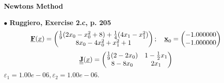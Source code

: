 \documentclass{report}[10pts]
\begin{document}
   \begin{center}
   \textbf{\Large{Newtons Method}}
   \end{center}
$\bullet$
\textbf{Ruggiero, Exercise 2.c, p. 205}
\[
   \Vector{F}(\underline{x})=
      \begin{pmatrix*}
      \frac{1}{9}(2x_0-x_0^2+8)+\frac{1}{4}(4x_1-x_1^2) \\ 8x_0-4x_0^2+x_1^2+1
      \end{pmatrix*}
   ;\quad
   \Vector{x}_0=
      \begin{pmatrix*}[r]
      -1.000000 \\ -1.000000
      \end{pmatrix*}
\]
\[
   \Matrix{J}(\underline{x})=
      \begin{pmatrix*}
         \frac{1}{9}(2-2x_0) & 1-\frac{1}{2}x_1\\
         8-8x_0 & 2x_1\\
      \end{pmatrix*}
\]
$
\varepsilon_1=1.00e-06,
\varepsilon_2=1.00e-06.
$
\end{document}
